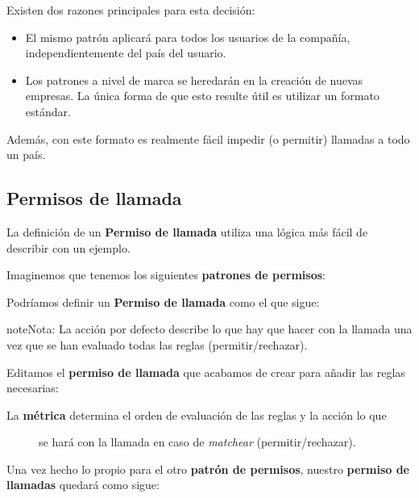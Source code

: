 \documentclass[letterpaper,10pt,spanish]{sphinxmanual}
\begin{document}
Existen dos razones principales para esta decisión:
\begin{itemize}
\item {} 
El mismo patrón aplicará para todos los usuarios de la compañía, independientemente del país del usuario.

\item {} 
Los patrones a nivel de marca se heredarán en la creación de nuevas empresas. La única forma de que esto resulte útil es utilizar un formato estándar.

\end{itemize}

Además, con este formato es realmente fácil impedir (o permitir) llamadas a todo un país.


\subsection{Permisos de llamada}
\label{pbx_features/call_permissions:call-acl}
La definición de un \textbf{Permiso de llamada} utiliza una lógica más fácil de describir con un ejemplo.

Imaginemos que tenemos los siguientes \textbf{patrones de permisos}:

\noindent{}

Podríamos definir un \textbf{Permiso de llamada} como el que sigue:

\noindent{}

\begin{notice}{note}{Nota:}
La acción por defecto describe lo que hay que hacer con la llamada una vez que se han evaluado todas las reglas (permitir/rechazar).
\end{notice}

Editamos el \textbf{permiso de llamada} que acabamos de crear para añadir las reglas necesarias:

\noindent{}
\begin{description}
\item[{La \textbf{métrica} determina el orden de evaluación de las reglas y la acción lo que}] \leavevmode
se hará con la llamada en caso de \emph{matchear} (permitir/rechazar).

\end{description}

\noindent{}

Una vez hecho lo propio para el otro \textbf{patrón de permisos}, nuestro \textbf{permiso de llamadas} quedará como sigue:
\end{document}
